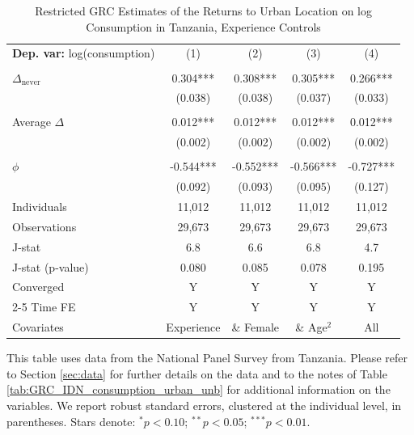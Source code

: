 \begin{table}[htbp] \centering \begin{threeparttable}
 \caption{Restricted GRC Estimates of the Returns to Urban Location on log Consumption in Tanzania, Experience Controls} 
 \label{tab:GRC_TZA_consumption_urban_unb_exp} 
\begin{tabular}{l cccc} \toprule  \textbf{Dep. var:}  log(consumption) 
                    &\multicolumn{1}{c}{(1)}   &\multicolumn{1}{c}{(2)}   &\multicolumn{1}{c}{(3)}   &\multicolumn{1}{c}{(4)}   \\
                    &               &               &               &               \\
\addlinespace
$\Delta_{\text{never}}$&       0.304***&       0.308***&       0.305***&       0.266***\\
                    &     (0.038)   &     (0.038)   &     (0.037)   &     (0.033)   \\
                    &               &               &               &               \\
\addlinespace
Average $\Delta$    &       0.012***&       0.012***&       0.012***&       0.012***\\
                    &     (0.002)   &     (0.002)   &     (0.002)   &     (0.002)   \\
                    &               &               &               &               \\
\addlinespace
$\phi$              &      -0.544***&      -0.552***&      -0.566***&      -0.727***\\
                    &     (0.092)   &     (0.093)   &     (0.095)   &     (0.127)   \\
\addlinespace
Individuals         &      11,012   &      11,012   &      11,012   &      11,012   \\
Observations        &      29,673   &      29,673   &      29,673   &      29,673   \\
J-stat              &         6.8   &         6.6   &         6.8   &         4.7   \\
J-stat (p-value)    &       0.080   &       0.085   &       0.078   &       0.195   \\
Converged           &           Y   &           Y   &           Y   &           Y   \\
\cmidrule{2-5} Time FE & Y & Y & Y & Y \\ Covariates & Experience & \& Female & \& Age$^2$ & All \\ \bottomrule \end{tabular} \begin{tablenotes}[flushleft] \footnotesize \item{This table uses data from the National Panel Survey from Tanzania. Please refer to Section \ref{sec:data} for further details on the data and to the notes of Table \ref{tab:GRC_IDN_consumption_urban_unb} for additional information on the variables. We report robust standard errors, clustered at the individual level, in parentheses. Stars denote: $^{*} p<0.10$; $^{**} p<0.05$; $^{***} p<0.01$.} \end{tablenotes} \end{threeparttable} \end{table}
